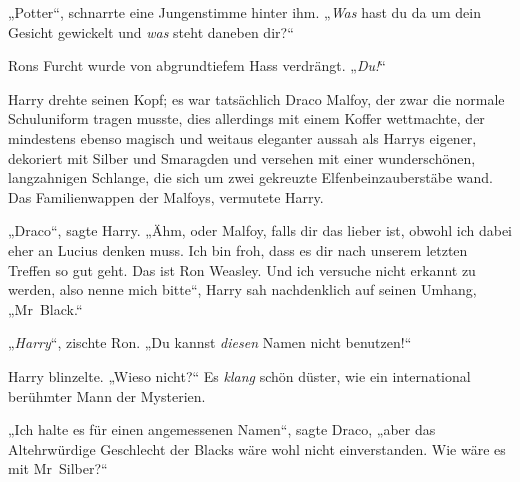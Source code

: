 „Potter“, schnarrte eine Jungenstimme hinter ihm.
„\emph{Was} hast du da um dein Gesicht gewickelt und \emph{was} steht daneben dir?“

Rons Furcht wurde von abgrundtiefem Hass verdrängt.
„\emph{Du!}“

Harry drehte seinen Kopf; es war tatsächlich Draco Malfoy, der zwar die normale Schuluniform tragen musste, dies allerdings mit einem Koffer wettmachte, der mindestens ebenso magisch und weitaus eleganter aussah als Harrys eigener, dekoriert mit Silber und Smaragden und versehen mit einer wunderschönen, langzahnigen Schlange, die sich um zwei gekreuzte Elfenbeinzauberstäbe wand. Das Familienwappen der Malfoys, vermutete Harry.

„Draco“, sagte Harry. „Ähm, oder Malfoy, falls dir das lieber ist, obwohl ich dabei eher an Lucius denken muss. Ich bin froh, dass es dir nach unserem letzten Treffen so gut geht. Das ist Ron Weasley. Und ich versuche nicht erkannt zu werden, also nenne mich bitte“, Harry sah nachdenklich auf seinen Umhang,
„Mr~Black.“

„\emph{Harry}“, zischte Ron.
„Du kannst \emph{diesen} Namen nicht benutzen!“

Harry blinzelte.
„Wieso nicht?“ Es \emph{klang} schön düster, wie ein international berühmter Mann der Mysterien.

„Ich halte es für einen angemessenen Namen“, sagte Draco, „aber das Altehrwürdige Geschlecht der Blacks wäre wohl nicht einverstanden. Wie wäre es mit Mr~Silber?“

